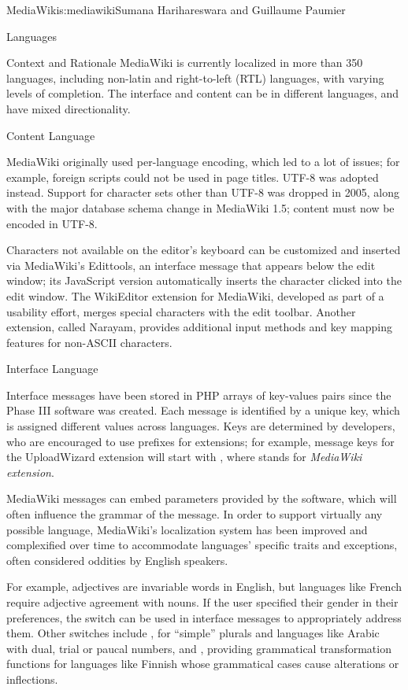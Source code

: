 \begin{aosachapter}{MediaWiki}{s:mediawiki}{Sumana Harihareswara and Guillaume Paumier}
\begin{aosasect1}{Languages}
\begin{aosasect2}{Context and Rationale}
MediaWiki is currently localized in more than 350 languages, including
non-latin and right-to-left (RTL) languages, with varying levels of
completion. The interface and content can be in different languages,
and have mixed directionality.

\end{aosasect2}

\begin{aosasect2}{Content Language}

MediaWiki originally used per-language encoding, which led to a lot of
issues; for example, foreign scripts could not be used in page
titles. UTF-8 was adopted instead. Support for character sets other
than UTF-8 was dropped in 2005, along with the major database schema
change in MediaWiki 1.5; content must now be encoded in UTF-8.

Characters not available on the editor's keyboard can be customized and
inserted via MediaWiki's Edittools, an interface message that appears
below the edit window; its JavaScript version automatically inserts
the character clicked into the edit window. The WikiEditor extension
for MediaWiki, developed as part of a usability effort, merges special
characters with the edit toolbar. Another extension, called Narayam,
provides additional input methods and key mapping features for
non-ASCII characters.

\end{aosasect2}

\begin{aosasect2}{Interface Language}

Interface messages have been stored in PHP arrays of key-values pairs
since the Phase III software was created. Each message is identified
by a unique key, which is assigned different values across
languages. Keys are determined by developers, who are encouraged to
use prefixes for extensions; for example, message keys for the
UploadWizard extension will start with , where
 stands for \emph{MediaWiki extension}.

MediaWiki messages can embed parameters provided by the software,
which will often influence the grammar of the message. In order to
support virtually any possible language, MediaWiki's localization
system has been improved and complexified over time to accommodate
languages' specific traits and exceptions, often considered oddities by
English speakers.

For example, adjectives are invariable words in English, but languages
like French require adjective agreement with nouns. If the user
specified their gender in their preferences, the 
switch can be used in interface messages to appropriately address
them. Other switches include , for ``simple'' plurals
and languages like Arabic with dual, trial or paucal numbers, and
, providing grammatical transformation functions
for languages like Finnish whose grammatical cases cause alterations
or inflections.


\end{aosasect2}
\end{aosasect1}
\end{aosachapter}
